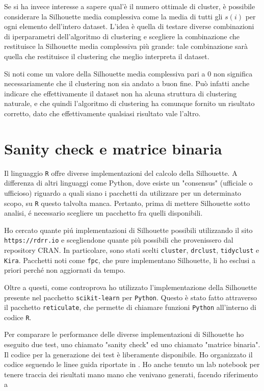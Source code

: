 \documentclass[12pt]{report}
\begin{document}
			Se si ha invece interesse a sapere qual'è il numero ottimale di
			cluster, è possibile considerare la Silhouette media complessiva
			come la media di tutti gli $s(i)$ per ogni elemento dell'intero
			dataset. L'idea è quella di testare diverse combinazioni di
			iperparametri dell'algoritmo di clustering e scegliere la
			combinazione che restituisce la Silhouette media complessiva più
			grande: tale combinazione sarà quella che restituisce il clustering
			che meglio interpreta il dataset.

			Si noti come un valore della Silhouette media complessiva
			pari a $0$ non significa necessariamente che il clustering
			non sia andato a buon fine. Può infatti anche indicare che
			effettivamente il dataset non ha alcuna struttura di clustering
			naturale, e che quindi l'algoritmo di clustering ha comunque
			fornito un risultato corretto, dato che effettivamente qualsiasi
			risultato vale l'altro.

		\section{Sanity check e matrice binaria}

			Il linguaggio \texttt{R} offre diverse implementazioni del
			calcolo della Silhouette. A differenza di altri linguaggi come
			Python, dove esiste un "consensus" (ufficiale o ufficioso) riguardo
			a quali siano i pacchetti da utilizzare per un determinato scopo,
			su \texttt{R} questo talvolta manca. Pertanto, prima di mettere
			Silhouette sotto analisi, é necessario scegliere un pacchetto fra
			quelli disponibili.

			Ho cercato quante piú implementazioni di Silhouette possibili
			utilizzando il sito \texttt{https://rdrr.io} e scegliendone
			quante più possibili che provenissero dal repository CRAN.
			In particolare, sono stati scelti \texttt{cluster},
			\texttt{drclust}, \texttt{tidyclust} e \texttt{Kira}. Pacchetti
			noti come \texttt{fpc}, che pure implementano Silhouette, li ho
			esclusi a priori perché non aggiornati da tempo.

			Oltre a questi, come controprova ho utilizzato l'implementazione
			della Silhouette presente nel pacchetto \texttt{scikit-learn} per
			\texttt{Python}. Questo è stato fatto attraverso il pacchetto
			\texttt{reticulate}, che permette di chiamare funzioni \texttt{Python}
			all'interno di codice \texttt{R}.

			Per comparare le performance delle diverse implementazioni di
			Silhouette ho eseguito due test, uno chiamato "sanity check" ed
			uno chiamato "matrice binaria". Il codice per la generazione dei
			test è liberamente disponibile. Ho organizzato il codice seguendo
			le linee guida riportate in \cite{10.1371/journal.pcbi.1000424}.
			Ho anche tenuto un lab notebook per tenere traccia dei risultati
			mano mano che venivano generati, facendo riferimento a \cite{10.1371/journal.pcbi.1004385}
\end{document}
